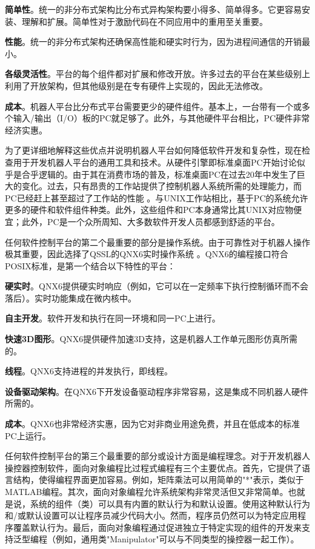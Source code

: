 \documentclass[UTF8,a4paper,12pt]{ctexart}
\begin{document}
\textbf{简单性}。统一的非分布式架构比分布式异构架构要小得多、简单得多。它更容易安装、理解和扩展。简单性对于激励代码在不同应用中的重用至关重要。

\textbf{性能}。统一的非分布式架构还确保高性能和硬实时行为，因为进程间通信的开销最小。

\textbf{各级灵活性}。平台的每个组件都对扩展和修改开放。许多过去的平台在某些级别上利用了开放架构，但其他级别是在专有硬件上实现的，因此无法修改。

\textbf{成本}。机器人平台比分布式平台需要更少的硬件组件。基本上，一台带有一个或多个输入/输出（I/O）板的PC就足够了。此外，与其他硬件平台相比，PC硬件非常经济实惠。

为了更详细地解释这些优点并说明机器人平台如何降低软件开发和复杂性，现在检查用于开发机器人平台的通用工具和技术。从硬件引擎即标准桌面PC开始讨论似乎是合乎逻辑的。由于其在消费市场的普及，标准桌面PC在过去20年中发生了巨大的变化。过去，只有昂贵的工作站提供了控制机器人系统所需的处理能力，而PC已经赶上甚至超过了工作站的性能 \cite{Costescu1999}。与UNIX工作站相比，基于PC的系统允许更多的硬件和软件组件种类。此外，这些组件和PC本身通常比其UNIX对应物便宜；此外，PC是一个众所周知、大多数软件开发人员都感到舒适的平台。

任何软件控制平台的第二个最重要的部分是操作系统。由于可靠性对于机器人操作极其重要，因此选择了QSSL的QNX6实时操作系统 \cite{QSSL}。QNX6的编程接口符合POSIX标准，是第一个结合以下特性的平台：

\textbf{硬实时}。QNX6提供硬实时响应（例如，它可以在一定频率下执行控制循环而不会落后）。实时功能集成在微内核中。

\textbf{自主开发}。软件开发和执行在同一环境和同一PC上进行。

\textbf{快速3D图形}。QNX6提供硬件加速3D支持，这是机器人工作单元图形仿真所需的。

\textbf{线程}。QNX6支持进程的并发执行，即线程。

\textbf{设备驱动架构}。在QNX6下开发设备驱动程序非常容易，这是集成不同机器人硬件所需的。

\textbf{成本}。QNX6也非常经济实惠，因为它对非商业用途免费，并且在低成本的标准PC上运行。

任何软件控制平台的第三个最重要的部分或设计方面是编程理念。对于开发机器人操控器控制软件，面向对象编程比过程式编程有三个主要优点。首先，它提供了语言结构，使得编程界面更加容易。例如，矩阵乘法可以用简单的"*"表示，类似于MATLAB编程。其次，面向对象编程允许系统架构非常灵活但又非常简单。也就是说，系统的组件（类）可以具有内置的默认行为和默认设置。使用这种默认行为和/或默认设置可以让程序员减少代码大小。然而，程序员仍然可以为特定应用程序覆盖默认行为。最后，面向对象编程通过促进独立于特定实现的组件的开发来支持泛型编程（例如，通用类"Manipulator"可以与不同类型的操控器一起工作）。
\end{document}
